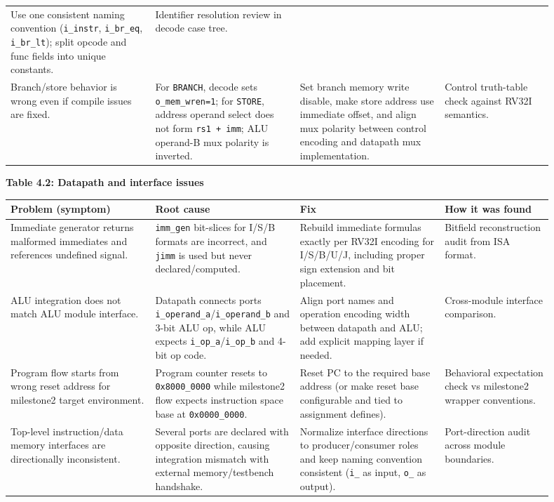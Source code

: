 \documentclass[10pt,a4paper]{article}
\begin{document}
\begin{center}
\begin{tabular}{@{}p{0.24\linewidth}p{0.24\linewidth}p{0.24\linewidth}p{0.18\linewidth}@{}}
Use one consistent naming convention (\texttt{i\_instr}, \texttt{i\_br\_eq}, \texttt{i\_br\_lt}); split opcode and func fields into unique constants. &
Identifier resolution review in decode case tree. \\
\addlinespace
Branch/store behavior is wrong even if compile issues are fixed. &
For \texttt{BRANCH}, decode sets \texttt{o\_mem\_wren=1}; for \texttt{STORE}, address operand select does not form \texttt{rs1 + imm}; ALU operand-B mux polarity is inverted. &
Set branch memory write disable, make store address use immediate offset, and align mux polarity between control encoding and datapath mux implementation. &
Control truth-table check against RV32I semantics. \\
\bottomrule
\end{tabular}
\end{center}

\textbf{Table 4.2: Datapath and interface issues}

\begin{center}
\small
\begin{tabular}{@{}p{0.24\linewidth}p{0.24\linewidth}p{0.24\linewidth}p{0.18\linewidth}@{}}
\toprule
\textbf{Problem (symptom)} & \textbf{Root cause} & \textbf{Fix} & \textbf{How it was found} \\
\midrule
Immediate generator returns malformed immediates and references undefined signal. &
\texttt{imm\_gen} bit-slices for I/S/B formats are incorrect, and \texttt{jimm} is used but never declared/computed. &
Rebuild immediate formulas exactly per RV32I encoding for I/S/B/U/J, including proper sign extension and bit placement. &
Bitfield reconstruction audit from ISA format. \\
\addlinespace
ALU integration does not match ALU module interface. &
Datapath connects ports \texttt{i\_operand\_a}/\texttt{i\_operand\_b} and 3-bit ALU op, while ALU expects \texttt{i\_op\_a}/\texttt{i\_op\_b} and 4-bit op code. &
Align port names and operation encoding width between datapath and ALU; add explicit mapping layer if needed. &
Cross-module interface comparison. \\
\addlinespace
Program flow starts from wrong reset address for milestone2 target environment. &
Program counter resets to \texttt{0x8000\_0000} while milestone2 flow expects instruction space base at \texttt{0x0000\_0000}. &
Reset PC to the required base address (or make reset base configurable and tied to assignment defines). &
Behavioral expectation check vs milestone2 wrapper conventions. \\
\addlinespace
Top-level instruction/data memory interfaces are directionally inconsistent. &
Several ports are declared with opposite direction, causing integration mismatch with external memory/testbench handshake. &
Normalize interface directions to producer/consumer roles and keep naming convention consistent (\texttt{i\_} as input, \texttt{o\_} as output). &
Port-direction audit across module boundaries. \\
\bottomrule
\end{tabular}
\end{center}
\end{document}
